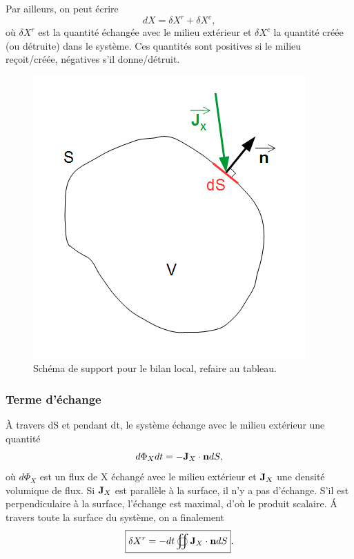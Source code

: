 \documentclass[11pt,a4paper]{report}
\begin{document}
Par ailleurs, on peut écrire
\begin{equation}	
	\boxed{dX = \delta X^r + \delta X^c},
\end{equation}
où $\delta X^r$ est la quantité échangée avec le milieu extérieur et $\delta X^c$ la quantité créée (ou détruite) dans le système. Ces quantités sont positives si le milieu reçoit/créée, négatives s'il donne/détruit.

\begin{figure}[h!]
	\begin{center}
  		\includegraphics[scale = 0.8]{bilan.png}
		\caption{Schéma de support pour le bilan local, refaire au tableau.}
	\end{center}
\end{figure}

\subsubsection{Terme d'échange}
\`A travers dS et pendant dt, le système échange avec le milieu extérieur une quantité
\begin{equation}
	d\Phi_X dt = - \bold{J}_X\cdot\bold{n}dS,
\end{equation}
où $d\Phi_X$ est un flux de X échangé avec le milieu extérieur et $\bold{J}_X$ une densité volumique de flux. Si $\bold{J}_X$ est parallèle à la surface, il n'y a pas d'échange. S'il est perpendiculaire à la surface, l'échange est maximal, d'où le produit scalaire. \'A travers toute la surface du système, on a finalement
\begin{equation}
	\boxed{\delta X^r = - dt \oiint \bold{J}_X\cdot\bold{n}dS}.
\end{equation}
\end{document}
